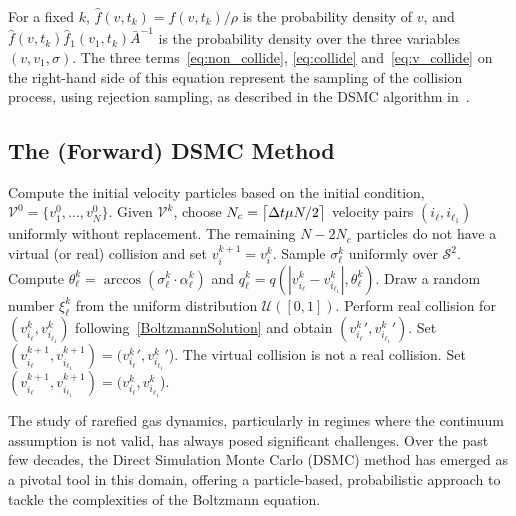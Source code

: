 \documentclass[12pt]{amsart}
\DeclarePairedDelimiter{\ceil}{\lceil}{\rceil}
\newcommand{\cS}{\mathcal S} \newcommand{\cT}{\mathcal T}
\newcommand{\Stwo}{{\cS^2}}
\begin{document}
For a fixed $k$, $\hat f(v,t_k) =  f(v,t_k)  / \rho$ is the probability density of $v$, and $ \hat f(v,t_k)  \hat f_1(v_1,t_k) {\bar A}^{-1}$ is the probability density over the three variables $(v,v_1,\sigma)$. The three terms~\eqref{eq:non_collide}, \eqref{eq:collide} and~\eqref{eq:v_collide} on the right-hand side of this equation represent the sampling of the collision process, using rejection sampling, as described in the DSMC algorithm in~.





\subsection{The (Forward) DSMC Method}\label{subsec:DSMC}

\begin{algorithm}
  \caption{DSMC Algorithm Using Rejection Sampling for a General Collision Kernel $q$ in the Nonlinear Boltzmann Equation.}\label{alg:VHS_DSMC} 
\begin{algorithmic}[1]
\State  Compute the initial velocity particles based on the initial condition, $\mathcal V^0 = \{v^0_1,\dots,v^0_N\}$. 
\State Given $\mathcal V^{k}$, choose $N_c=\ceil[\big]{ \Delta t \mu N/2}$  velocity pairs $(i_\ell ,i_{\ell_1})$ uniformly without replacement. The remaining $N-2N_c$ particles do not have a virtual (or real) collision and set $v^{k+1}_{i} = v^{k}_{i}$.
\State Sample $\sigma^k_\ell$ uniformly over $\Stwo$.
\State Compute $\theta^k_\ell = \arccos ( \sigma^k_\ell \cdot  \alpha^k_\ell )$ and $q^k_\ell=q( |v^k_{i_{\ell }}-v^k_{i_{\ell_1}}|, \theta^k_\ell)$.
\State Draw a random number $\xi^k_\ell$ from the uniform distribution $\mathcal{U}([0,1])$.
\State Perform real collision for $( v^k_{i_{\ell }}, v^k_{i_{\ell_1}})$ following~\eqref{BoltzmannSolution} and obtain $({v^k_{i_{\ell }}}', {v^k_{i_{\ell_1}}}')$.
\State Set $( v^{k+1}_{i_{\ell }} , v^{k+1}_{i_{\ell_1 }} ) = ({v^k_{i_{\ell }}}', {v^k_{i_{\ell_1}}}'$).
\Else 
\State The virtual collision is not a real collision. Set $( v^{k+1}_{i_{\ell }} , v^{k+1}_{i_{\ell_1}} ) = ({v^k_{i_{\ell }}}, {v^k_{i_{\ell_1}}}$).
\EndIf
\EndFor
\EndFor
\end{algorithmic}
\end{algorithm}

The study of rarefied gas dynamics, particularly in regimes where the continuum assumption is not valid, has always posed significant challenges. Over the past few decades, the Direct Simulation Monte Carlo (DSMC) method has emerged as a pivotal tool in this domain, offering a particle-based, probabilistic approach to tackle the complexities of the Boltzmann equation.
\end{document}
